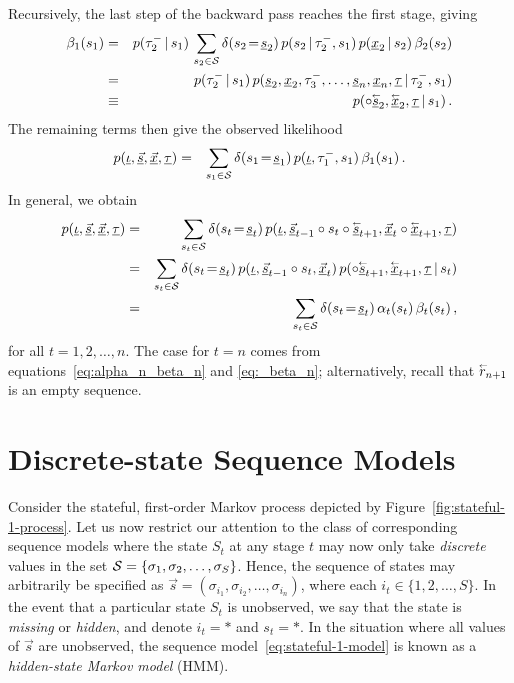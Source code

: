 \documentclass[a4paper]{article}
\newcommand{\rvec}[1]{\accentset{\leftarrow}{#1}}
\begin{document}
Recursively, the last step of the backward pass reaches the first stage, giving
\begin{eqnarray}
  \beta_{1}(s_{1}) & = &
p(\tau^-_2\,|\,s_{1})\,\sum_{s_2\in{\cal S}}\delta(s_2\!=\!\underline{s}_2)\,
p(s_2\,|\,\tau^-_2,s_{1})\,p(\underline{x}_{2}\,|\,s_2)
\,\beta_2(s_2)
\nonumber\\&=&
p(\tau^-_2\,|\,s_{1})\,
p(\underline{s}_2,\underline{x}_2,\tau^-_3,\ldots,\underline{s}_n,\underline{x}_n,\underline{\tau}\,|\,\tau^-_2,s_{1})
\nonumber\\&\equiv&
p(\circ\underline{\rvec{s}}_2,\underline{\rvec{x}}_2,\underline{\tau}\,|\,s_{1})\,.
\end{eqnarray}
The remaining terms then give the observed likelihood
\begin{eqnarray}
   p(\underline{\iota},\underline{\vec{s}},\underline{\vec{x}},\underline{\tau}) 
& = & 
   \sum_{s_1\in{\cal S}}\delta(s_1\!=\!\underline{s}_1)\,p(\underline{\iota},\tau^-_1,s_1)\,\beta_1(s_1)\,.
\end{eqnarray}
In general, we obtain
\begin{eqnarray}
   p(\underline{\iota},\underline{\vec{s}},\underline{\vec{x}},\underline{\tau}) 
& = & 
   \sum_{s_t\in{\cal S}}\delta(s_t\!=\!\underline{s}_t)\,
   p(\underline{\iota},\underline{\vec{s}}_{t-1}\circ s_t\circ\underline{\rvec{s}}_{t+1},
\underline{\vec{x}}_t\circ\underline{\rvec{x}}_{t+1},\underline{\tau}) 
\nonumber\\&=&
   \sum_{s_t\in{\cal S}}\delta(s_t\!=\!\underline{s}_t)\,
p(\underline{\iota},\underline{\vec{s}}_{t-1}\circ s_t,\underline{\vec{x}}_t)
\,p(\circ\underline{\rvec{s}}_{t+1},\underline{\rvec{x}}_{t+1},\underline{\tau}\,|\,s_{t})
\nonumber\\&=&
   \sum_{s_t\in{\cal S}}\delta(s_t\!=\!\underline{s}_t)\,\alpha_t(s_t)\,\beta_t(s_t)\,,
\end{eqnarray}
for all $t=1,2,\ldots,n$. The case for $t=n$ comes from equations~\eqref{eq:alpha_n_beta_n} and \eqref{eq:_beta_n}; alternatively, recall that $\rvec{r}_{n+1}$ is an empty sequence.

\section{Discrete-state Sequence Models}\label{sec:discrete-state}

Consider the stateful, first-order Markov process depicted by Figure~\ref{fig:stateful-1-process}.
Let us now restrict our attention to the class of corresponding sequence models where
the state $S_t$ at any stage $t$ may now only take {\em discrete} values in the set 
${\cal S}=\{\sigma_1,\sigma_2,\ldots,\sigma_S\}$.
Hence, the sequence of states may arbitrarily be specified as $\vec{s}=(\sigma_{i_1},\sigma_{i_2},\ldots,\sigma_{i_n})$,
where each $i_t\in\{1,2,\ldots,S\}$.
In the event that a particular state $S_t$ is unobserved, we say that the state is {\em missing} or {\em hidden},
and denote $i_t=*$ and $s_t=*$. In the situation where all values of $\vec{s}$ are unobserved,
the sequence model~\eqref{eq:stateful-1-model} is known as a {\em hidden-state Markov model} (HMM).
\end{document}
